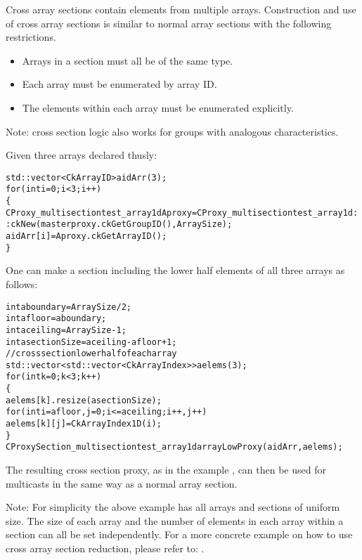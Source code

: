 Cross array sections contain elements from multiple arrays.
Construction and use of cross array sections is similar to normal
array sections with the following restrictions.

\begin{itemize}

\item Arrays in a section must all be of the same type.

\item Each array must be enumerated by array ID.

\item The elements within each array must be enumerated explicitly.

\end{itemize}

Note: cross section logic also works for groups with analogous characteristics.

Given three arrays declared thusly:

\begin{alltt}
	  std::vector<CkArrayID> aidArr(3);
	  for (int i=0; i<3; i++)
	    \{
	      CProxy\_multisectiontest\_array1d Aproxy = CProxy\_multisectiontest\_array1d::ckNew(masterproxy.ckGetGroupID(), ArraySize);
	      aidArr[i] = Aproxy.ckGetArrayID();
	    \}
\end{alltt}

One can make a section including the  lower half elements of all three
arrays as follows:

\begin{alltt}
	  int aboundary = ArraySize/2;
	  int afloor = aboundary;
	  int aceiling = ArraySize-1;
	  int asectionSize = aceiling-afloor+1;
	  // cross section lower half of each array
	  std::vector<std::vector<CkArrayIndex> > aelems(3);
	  for (int k=0; k<3; k++)
	    \{
	      aelems[k].resize(asectionSize);
	      for (int i=afloor,j=0; i<=aceiling; i++,j++)
	        aelems[k][j] = CkArrayIndex1D(i);
	    \}
	  CProxySection\_multisectiontest\_array1d arrayLowProxy(aidArr, aelems);
\end{alltt}

The resulting cross section proxy, as in the example ,
can then be used for multicasts in the same way as a normal array
section.

Note: For simplicity the above example has all arrays and sections of uniform
size.  The size of each array and the number of elements in each array
within a section can all be set independently.
For a more concrete example on how to use cross array section reduction,
please refer to: .




